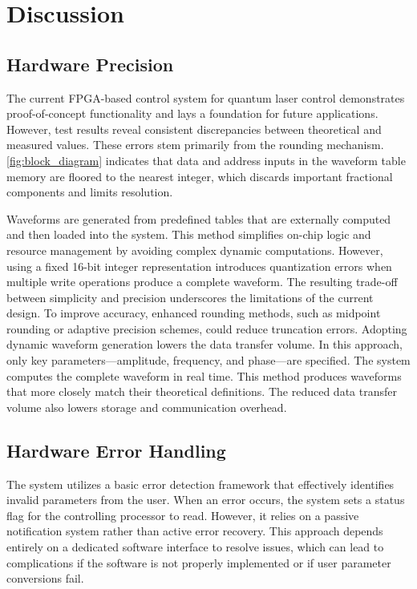 \chapter{Discussion}

\section{Hardware Precision}

The current FPGA-based control system for quantum laser control demonstrates proof-of-concept functionality and lays a foundation for future applications. However, test results reveal consistent discrepancies between theoretical and measured values. These errors stem primarily from the rounding mechanism. \autoref{fig:block_diagram} indicates that data and address inputs in the waveform table memory are floored to the nearest integer, which discards important fractional components and limits resolution.

Waveforms are generated from predefined tables that are externally computed and then loaded into the system. This method simplifies on-chip logic and resource management by avoiding complex dynamic computations. However, using a fixed 16-bit integer representation introduces quantization errors when multiple write operations produce a complete waveform. The resulting trade-off between simplicity and precision underscores the limitations of the current design. To improve accuracy, enhanced rounding methods, such as midpoint rounding or adaptive precision schemes, could reduce truncation errors. Adopting dynamic waveform generation lowers the data transfer volume. In this approach, only key parameters—amplitude, frequency, and phase—are specified. The system computes the complete waveform in real time. This method produces waveforms that more closely match their theoretical definitions. The reduced data transfer volume also lowers storage and communication overhead.

\section{Hardware Error Handling}

The system utilizes a basic error detection framework that effectively identifies invalid parameters from the user. When an error occurs, the system sets a status flag for the controlling processor to read. However, it relies on a passive notification system rather than active error recovery. This approach depends entirely on a dedicated software interface to resolve issues, which can lead to complications if the software is not properly implemented or if user parameter conversions fail.

